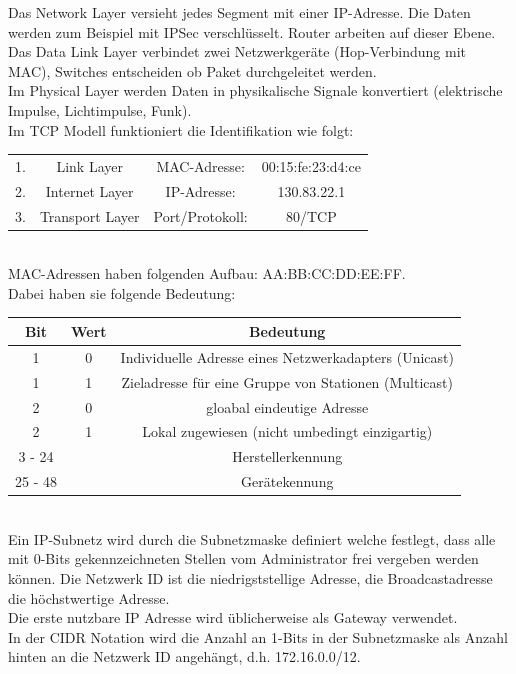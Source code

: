 \documentclass[a4paper,12pt,leqno]{article}
\begin{document}
Das Network Layer versieht jedes Segment mit einer IP-Adresse. Die Daten werden zum Beispiel mit IPSec verschlüsselt. Router arbeiten auf dieser Ebene.\\

Das Data Link Layer verbindet zwei Netzwerkgeräte (Hop-Verbindung mit MAC), Switches entscheiden ob Paket durchgeleitet werden.\\

Im Physical Layer werden Daten in physikalische Signale konvertiert (elektrische Impulse, Lichtimpulse, Funk).\\

Im TCP Modell funktioniert die Identifikation wie folgt:\\
\begin{tabular}{lccc}
1. & Link Layer & MAC-Adresse: & 00:15:fe:23:d4:ce\\
2. & Internet Layer & IP-Adresse:& 130.83.22.1\\
3. & Transport Layer & Port/Protokoll:& 80/TCP  
\end{tabular}\\

MAC-Adressen haben folgenden Aufbau: AA:BB:CC:DD:EE:FF.\\
Dabei haben sie folgende Bedeutung:\\

\begin{tabular}{|c|c|c|}
\hline
Bit & Wert & Bedeutung\\
\hline
 1 & 0 & Individuelle Adresse eines Netzwerkadapters (Unicast)\\
 1 & 1 & Zieladresse für eine Gruppe von Stationen (Multicast)\\
\hline
 2 & 0 & gloabal eindeutige Adresse\\
 2 & 1 & Lokal zugewiesen (nicht umbedingt einzigartig)\\
 \hline
 3 - 24 & & Herstellerkennung\\
 \hline
 25 - 48 & & Gerätekennung\\
 \hline
\end{tabular}\\

Ein IP-Subnetz wird durch die Subnetzmaske definiert welche festlegt, dass alle mit 0-Bits gekennzeichneten Stellen vom Administrator frei vergeben werden können. Die Netzwerk ID ist die niedrigststellige Adresse, die Broadcastadresse die höchstwertige Adresse.\\
Die erste nutzbare IP Adresse wird üblicherweise als Gateway verwendet.\\
In der CIDR Notation wird die Anzahl an 1-Bits in der Subnetzmaske als Anzahl hinten an die Netzwerk ID angehängt, d.h. 172.16.0.0/12.\\
\end{document}
